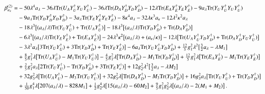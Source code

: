 \documentclass[final,3p,times,pdflatex]{elsarticle}
\newcommand{\lamsq}{\lambda^2}
\newcommand{\kapsq}{\kappa^2}
\newcommand{\tr}{\mathrm{Tr}}
\newcommand{\Alam}{a_\lambda/\lambda}
\newcommand{\Akap}{a_\kappa/\kappa}
\begin{document}
\begin{align}
\beta_{a_\lambda}^{(2)} =&-50\lambda^4 a_\lambda 
- 36\lambda\tr(U_A Y_U^\dagger Y_U Y_U^\dagger) 
- 36\lambda\tr(D_A Y_D^\dagger Y_D Y_D^\dagger)
- 12\lambda\tr(E_A Y_E^\dagger Y_E Y_E^\dagger) 
- 9a_\lambda\tr( Y_U Y_U^\dagger Y_U Y_U^\dagger) \notag \\
%
&- 9a_\lambda\tr( Y_D Y_D^\dagger Y_D Y_D^\dagger) 
- 3a_\lambda\tr( Y_E Y_E^\dagger Y_E Y_E^\dagger) - 8\kappa^4 a_\lambda 
- 32\lambda\kappa^3 a_\kappa - 12\lamsq\kapsq a_\lambda \notag \\
%
&-18\lambda^3\big[ (\Alam)\tr( Y_U Y_U^\dagger) + \tr(U_A Y_U^\dagger)\big] 
- 18\lambda^3\big[(\Alam)\tr( Y_D Y_D^\dagger) + \tr(D_A Y_D^\dagger)\big] \notag \\
%
&-6\lambda^3\big[(\Alam)\tr( Y_E Y_E^\dagger) + \tr(E_A Y_E^\dagger)\big] 
-24\lambda^3\kapsq\big[ (\Alam) + (\Akap)\big]
-12\lambda\big[ \tr(U_A Y_U^\dagger Y_D Y_D^\dagger) 
+ \tr(D_A Y_D^\dagger Y_U Y_U^\dagger) \big] \notag \\
%
&-3\lamsq a_\lambda\big[ 3\tr( Y_U Y_U^\dagger) + 3\tr( Y_D Y_D^\dagger) 
+ \tr( Y_E Y_E^\dagger) \big] -6a_\lambda\tr( Y_U Y_U^\dagger Y_D Y_D^\dagger) 
+ \tfrac{12}{5}g_1^2\lamsq\big[ \tfrac{3}{2}a_\lambda - \lambda M_1\big] \notag \\
%
&+\tfrac{8}{5}g_1^2\lambda\big[ \tr(U_A Y_U^\dagger) - M_1\tr( Y_U Y_U^\dagger) \big]
-\tfrac{4}{5}g_1^2\lambda\big[ \tr(D_A Y_D^\dagger) - M_1\tr( Y_D Y_D^\dagger)\big] 
+\tfrac{12}{5}g_1^2\lambda\big[\tr(E_A Y_E^\dagger) - M_1\tr( Y_E Y_E^\dagger)\big] 
\notag \\
%
&+\tfrac{2}{5}g_1^2 a_\lambda\big[ 2\tr( Y_U Y_U^\dagger) - \tr( Y_D Y_D^\dagger) 
+ 3\tr( Y_E Y_e^\dagger) \big] + 12g_2^2\lamsq\big[ \tfrac{3}{2}a_\lambda 
- \lambda M_2\big] \notag \\
%
&+32g_3^2\lambda\big[ \tr(U_A Y_U^\dagger) - M_3\tr( Y_U Y_U^\dagger) \big]
+32g_3^2\lambda\big[\tr(D_A Y_D^\dagger) - M_3\tr( Y_D Y_D^\dagger) \big] 
+ 16g_3^2 a_\lambda\big[ \tr( Y_U Y_U^\dagger) + \tr( Y_D Y_D^\dagger) \big] \notag \\
%
&+ \tfrac{1}{50}g_1^4\lambda\big[ 207(\Alam) - 828M_1\big] 
+ \tfrac{1}{2}g_2^4\lambda\big[ 15(\Alam) - 60M_2\big]
+\tfrac{9}{5}g_1^2 g_2^2\lambda\big[ (\Alam) - 2(M_1 + M_2)\big] \,.
\end{align}
\end{document}
